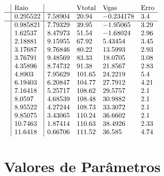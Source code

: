 \documentclass{article}
\begin{document}
\begin{doublespace}
\noindent\(\begin{array}{l|l|llll}
  & \text{Raio} & \text{} & \text{Vtotal} & \text{Vgas} & \text{Erro} \\
\hline
 \text{} & 0.295522 & 7.58904 & 20.94 & -0.234178 & 3.4 \\
\hline
  & 0.985821 & 7.79329 & 39.95 & -1.95065 & 3.29 \\
  & 1.62537 & 8.47973 & 51.54 & -1.68024 & 2.96 \\
  & 2.18881 & 9.15955 & 67.92 & 5.43454 & 3.45 \\
  & 3.17687 & 9.76846 & 80.22 & 13.5993 & 2.93 \\
  & 3.76791 & 9.48569 & 83.33 & 18.0705 & 3.08 \\
  & 4.35896 & 8.74732 & 91.38 & 21.8567 & 2.83 \\
  & 4.8903 & 7.95629 & 101.65 & 24.2219 & 5.4 \\
  & 6.19403 & 6.20847 & 104.77 & 27.7912 & 4.21 \\
  & 7.16418 & 5.25717 & 108.62 & 29.5757 & 2.1 \\
  & 8.0597 & 4.68539 & 108.48 & 30.9882 & 2.1 \\
  & 8.95522 & 4.27244 & 108.73 & 33.3072 & 2.1 \\
  & 9.85075 & 3.43065 & 110.24 & 36.6602 & 2.1 \\
  & 10.7463 & 1.87414 & 110.63 & 38.4926 & 2.33 \\
  & 11.6418 & 0.66706 & 111.52 & 36.585 & 4.74 \\
\end{array}\)
\end{doublespace}

\subsection*{}

\section*{Valores de Par{\^ a}metros}
\end{document}
